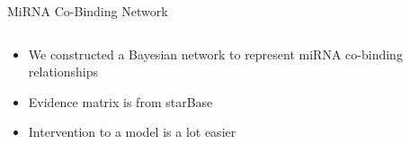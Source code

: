 \documentclass{beamer}
\begin{document}
\begin{frame}{MiRNA Co-Binding Network}
\begin{columns}
		\begin{column}[t]{.48\textwidth}
			\begin{itemize}
				\item We constructed a Bayesian network to represent miRNA co-binding relationships
				\item Evidence matrix is from starBase
				      \begin{table}[]
				      \end{table}
				\item Intervention to a model is a lot easier
			\end{itemize}
		\end{column}
	\end{columns}
\end{frame}
\end{document}

